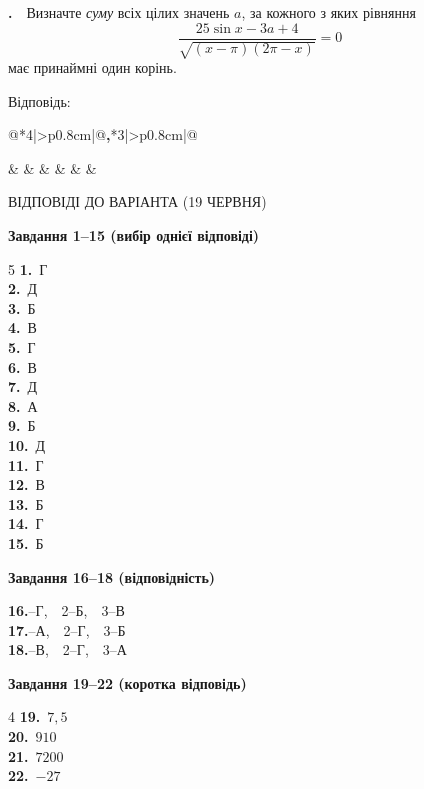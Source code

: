 \documentclass[12pt]{article}
\makeatletter
\newcommand{\sectionTitle}[1]{%
\par\vspace{0.4cm}
\begin{tcolorbox}[colback=titleBg, colframe=titleBg, boxrule=0pt, arc=8pt, halign=center, fontupper=\Large\bfseries\color{mainGreen}]
#1
\end{tcolorbox}\par\vspace{0.3cm}}
\newcommand{\nmtAnswerBox}{%
\par\vspace{0.2cm}\noindent
Відповідь:\ \ 
\begin{tabular}{@{}*{4}{|>{\centering\arraybackslash}p{0.8cm}}|@{\hspace{0.1cm}\textbf{,}\hspace{0.1cm}}*{3}{|>{\centering\arraybackslash}p{0.8cm}}|@{}}
\hline
\rule[-0.2cm]{0pt}{0.7cm} & & & & & & \\
\hline
\end{tabular}
\par\vspace{0.3cm}}
\newcounter{zad}
\newcommand{\zadtask}[1]{\stepcounter{zad}\par\vspace{0.3cm}\noindent\textbf{\thezad.}\ \ #1\par\vspace{0.2cm}}
\makeatother
\begin{document}
\zadtask{Визначте \textit{суму} всіх цілих значень $a$, за кожного з яких рівняння
\[
\dfrac{25\sin x - 3a + 4}{\sqrt{(x - \pi)(2\pi - x)}} = 0
\]
має принаймні один корінь.}
\nmtAnswerBox

\newpage
\sectionTitle{ВІДПОВІДІ ДО ВАРІАНТА (19 ЧЕРВНЯ)}

\noindent\textbf{\large Завдання 1--15 (вибір однієї відповіді)}
\par\vspace{0.2cm}
\begin{multicols}{5}
\noindent
\textbf{1.}~Г\\
\textbf{2.}~Д\\
\textbf{3.}~Б\\
\textbf{4.}~В\\
\textbf{5.}~Г\\
\textbf{6.}~В\\
\textbf{7.}~Д\\
\textbf{8.}~А\\
\textbf{9.}~Б\\
\textbf{10.}~Д\\
\textbf{11.}~Г\\
\textbf{12.}~В\\
\textbf{13.}~Б\\
\textbf{14.}~Г\\
\textbf{15.}~Б
\end{multicols}

\par\vspace{0.3cm}
\noindent\textbf{\large Завдання 16--18 (відповідність)}
\par\vspace{0.2cm}
\noindent
\textbf{16.}--Г,\ \ 2--Б,\ \ 3--В\\[0.15cm]
\textbf{17.}--А,\ \ 2--Г,\ \ 3--Б\\[0.15cm]
\textbf{18.}\quad 1--В,\ \ 2--Г,\ \ 3--А

\par\vspace{0.3cm}
\noindent\textbf{\large Завдання 19--22 (коротка відповідь)}
\par\vspace{0.2cm}
\begin{multicols}{4}
\noindent
\textbf{19.}~$7{,}5$\\
\textbf{20.}~$910$\\
\textbf{21.}~$7200$\\
\textbf{22.}~$-27$
\end{multicols}
\end{document}
